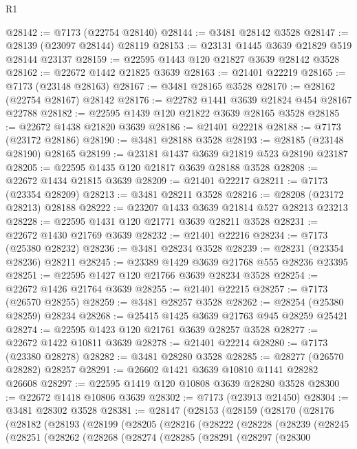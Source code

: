 \begin{lexlean}{R1}
\begin{coremodule}
@28142 := @7173 (@22754 @28140)
@28144 := @3481 @28142 @3528
@28147 := @28139 (@23097 @28144) @28119
@28153 := @23131 @1445 @3639 @21829 @519 @28144 @23137
@28159 := @22595 @1443 @120 @21827 @3639 @28142 @3528
@28162 := @22672 @1442 @21825 @3639
@28163 := @21401 @22219
@28165 := @7173 (@23148 @28163)
@28167 := @3481 @28165 @3528
@28170 := @28162 (@22754 @28167) @28142
@28176 := @22782 @1441 @3639 @21824 @454 @28167 @22788
@28182 := @22595 @1439 @120 @21822 @3639 @28165 @3528
@28185 := @22672 @1438 @21820 @3639
@28186 := @21401 @22218
@28188 := @7173 (@23172 @28186)
@28190 := @3481 @28188 @3528
@28193 := @28185 (@23148 @28190) @28165
@28199 := @23181 @1437 @3639 @21819 @523 @28190 @23187
@28205 := @22595 @1435 @120 @21817 @3639 @28188 @3528
@28208 := @22672 @1434 @21815 @3639
@28209 := @21401 @22217
@28211 := @7173 (@23354 @28209)
@28213 := @3481 @28211 @3528
@28216 := @28208 (@23172 @28213) @28188
@28222 := @23207 @1433 @3639 @21814 @527 @28213 @23213
@28228 := @22595 @1431 @120 @21771 @3639 @28211 @3528
@28231 := @22672 @1430 @21769 @3639
@28232 := @21401 @22216
@28234 := @7173 (@25380 @28232)
@28236 := @3481 @28234 @3528
@28239 := @28231 (@23354 @28236) @28211
@28245 := @23389 @1429 @3639 @21768 @555 @28236 @23395
@28251 := @22595 @1427 @120 @21766 @3639 @28234 @3528
@28254 := @22672 @1426 @21764 @3639
@28255 := @21401 @22215
@28257 := @7173 (@26570 @28255)
@28259 := @3481 @28257 @3528
@28262 := @28254 (@25380 @28259) @28234
@28268 := @25415 @1425 @3639 @21763 @945 @28259 @25421
@28274 := @22595 @1423 @120 @21761 @3639 @28257 @3528
@28277 := @22672 @1422 @10811 @3639
@28278 := @21401 @22214
@28280 := @7173 (@23380 @28278)
@28282 := @3481 @28280 @3528
@28285 := @28277 (@26570 @28282) @28257
@28291 := @26602 @1421 @3639 @10810 @1141 @28282 @26608
@28297 := @22595 @1419 @120 @10808 @3639 @28280 @3528
@28300 := @22672 @1418 @10806 @3639
@28302 := @7173 (@23913 @21450)
@28304 := @3481 @28302 @3528
@28381 := @28147
    (@28153
      (@28159
        (@28170
          (@28176
            (@28182
              (@28193
                (@28199
                  (@28205
                    (@28216
                      (@28222
                        (@28228
                          (@28239
                            (@28245
                              (@28251
                                (@28262
                                  (@28268
                                    (@28274
                                      (@28285
                                        (@28291
                                          (@28297
                                            (@28300

\end{coremodule}
\end{lexlean}
